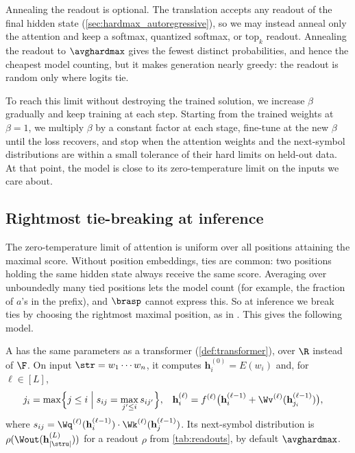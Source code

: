 Annealing the readout is optional. The translation accepts any readout of the final hidden state
(\cref{sec:hardmax_autoregressive}), so we may instead anneal only the attention and keep a softmax, quantized
softmax, or $\mathrm{top}_k$ readout. Annealing the readout to $\avghardmax$ gives the fewest distinct
probabilities, and hence the cheapest model counting, but it makes generation nearly greedy:
the readout is random only where logits tie.

To reach this limit without destroying the trained solution, we increase $\beta$ gradually
and keep training at each step. Starting from the trained weights at $\beta=1$,
we multiply $\beta$ by a constant factor at each stage, fine-tune at the new $\beta$ until the loss
recovers, and stop when the attention weights and the next-symbol distributions are within a
small tolerance of their hard limits on held-out data.
At that point, the model is close to its zero-temperature limit on the inputs we care about.

\subsection{Rightmost tie-breaking at inference}
\label{sec:rightmost}

The zero-temperature limit of attention is uniform over all positions attaining the maximal
score. Without position embeddings, ties are common: two positions holding the same hidden state
always receive the same score. Averaging over unboundedly many tied positions lets the model
count (for example, the fraction of $a$'s in the prefix), and $\brasp$ cannot express this.
So at inference we break ties by choosing the rightmost maximal position, as in
\citet{yang-etal-2024-masked}. This gives the following model.

\begin{definition} \label{def:rightmost_uhat}
A  has the same parameters as a transformer
(\cref{def:transformer}), over $\R$ instead of $\F$. On input $\str=w_1\cdots w_n$,
it computes $\mathbf{h}^{(0)}_i=E(w_i)$ and, for $\ell\in[L]$,
\begin{align}
j_i &= \max\Bigl\{j\leq i \Bigm| s_{ij}=\max_{j'\leq i}s_{ij'}\Bigr\}, &
\mathbf{h}^{(\ell)}_i &= f^{(\ell)}\bigl(\mathbf{h}^{(\ell-1)}_i+\Wv^{(\ell)}(\mathbf{h}^{(\ell-1)}_{j_i})\bigr),
\label{eq:rightmost}
\end{align}
where $s_{ij}=\Wq^{(\ell)}(\mathbf{h}^{(\ell-1)}_i)\cdot\Wk^{(\ell)}(\mathbf{h}^{(\ell-1)}_j)$.
Its next-symbol distribution is $\rho(\Wout(\mathbf{h}^{(L)}_{|\stru|}))$ for a readout $\rho$ from \cref{tab:readouts}, by default $\avghardmax$.
\end{definition}

